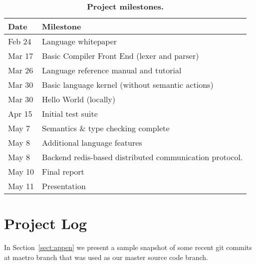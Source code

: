 \begin{table}[!h]
{%
 \begin{center}
    \begin{tabular}{ | l || l |}
    \hline
    \textbf{Date} & \textbf{Milestone}\\
    \hline
    \hline
    Feb 24 &  Language whitepaper\\ \hline
    Mar 17 &  Basic Compiler Front End (lexer and parser)\\ \hline
    Mar 26 &  Language reference manual and tutorial\\ \hline
    Mar 30 &  Basic language kernel (without semantic actions)\\ \hline
    Mar 30 &  Hello World (locally)\\ \hline
    Apr 15 &  Initial test suite \\ \hline
    May 7 &  Semantics \& type checking complete \\ \hline
    May 8 &  Additional language features \\ \hline
    May 8 &  Backend redis-based distributed communication protocol.\\ \hline
    May 10 &  Final report\\ \hline
    May 11 &  Presentation\\ \hline
    \end{tabular}
    \caption{\textbf{Project milestones.}}
    \label{tab:milestones}
 \end{center}
}
\end{table}


\section{Project Log}
In Section~\ref{sect:appen} we present a sample snapshot of some recent git
commits at maetro branch that was used as our master source code branch.
